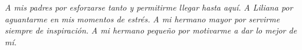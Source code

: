 \bigskip
\bigskip
\begin{flushright}
\bigskip
\emph{A mis padres por esforzarse tanto y permitirme llegar hasta aquí.}
\bigskip\bigskip
\linebreak
\bigskip
\emph{A Liliana por aguantarme en mis momentos de estrés.}
\bigskip
\linebreak
\bigskip
\emph{A mi hermano mayor por servirme siempre de inspiración.}
\bigskip
\linebreak
\bigskip
\emph{A mi hermano pequeño por motivarme a dar lo mejor de mí.}
\bigskip
\linebreak
\end{flushright}
